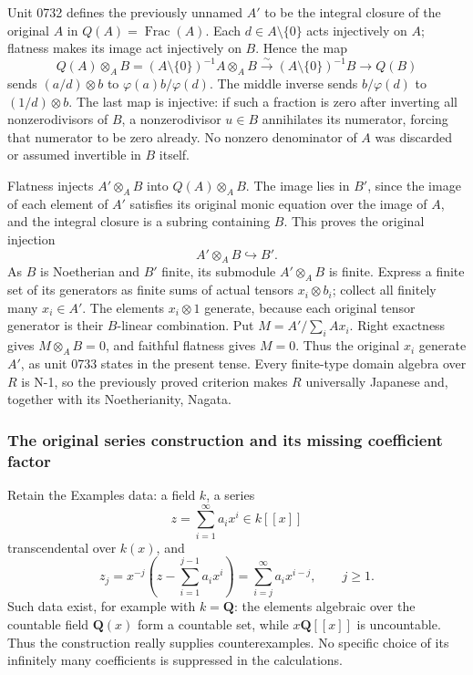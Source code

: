 Unit 0732 defines the previously unnamed \(A'\) to be the integral closure of the original \(A\) in \(Q(A)=\operatorname{Frac}(A)\). Each \(d\in A\setminus\{0\}\) acts injectively on \(A\); flatness makes its image act injectively on \(B\). Hence the map \[
 Q(A)\otimes_AB
 =(A\setminus\{0\})^{-1}A\otimes_AB
 \xrightarrow{\sim}(A\setminus\{0\})^{-1}B
 \longrightarrow Q(B)
\] sends \((a/d)\otimes b\) to \(\varphi(a)b/\varphi(d)\). The middle inverse sends \(b/\varphi(d)\) to \((1/d)\otimes b\). The last map is injective: if such a fraction is zero after inverting all nonzerodivisors of \(B\), a nonzerodivisor \(u\in B\) annihilates its numerator, forcing that numerator to be zero already. No nonzero denominator of \(A\) was discarded or assumed invertible in \(B\) itself.

Flatness injects \(A'\otimes_AB\) into \(Q(A)\otimes_AB\). The image lies in \(B'\), since the image of each element of \(A'\) satisfies its original monic equation over the image of \(A\), and the integral closure is a subring containing \(B\). This proves the original injection \[
 A'\otimes_AB\hookrightarrow B'.
\] As \(B\) is Noetherian and \(B'\) finite, its submodule \(A'\otimes_AB\) is finite. Express a finite set of its generators as finite sums of actual tensors \(x_i\otimes b_i\); collect all finitely many \(x_i\in A'\). The elements \(x_i\otimes1\) generate, because each original tensor generator is their \(B\)-linear combination. Put \(M=A'/\sum_iAx_i\). Right exactness gives \(M\otimes_AB=0\), and faithful flatness gives \(M=0\). Thus the original \(x_i\) generate \(A'\), as unit 0733 states in the present tense. Every finite-type domain algebra over \(R\) is N-1, so the previously proved criterion makes \(R\) universally Japanese and, together with its Noetherianity, Nagata.

\subsubsection{The original series construction and its missing coefficient factor}\label{algebra-proof-069-the-original-series-construction-and-its-missing-coefficient-factor}

Retain the Examples data: a field \(k\), a series \[
 z=\sum_{i=1}^{\infty}a_ix^i\in k[[x]]
\] transcendental over \(k(x)\), and \[
 z_j=x^{-j}\left(z-\sum_{i=1}^{j-1}a_ix^i\right)
     =\sum_{i=j}^{\infty}a_ix^{i-j},\qquad j\ge1.
\] Such data exist, for example with \(k=\mathbf Q\): the elements algebraic over the countable field \(\mathbf Q(x)\) form a countable set, while \(x\mathbf Q[[x]]\) is uncountable. Thus the construction really supplies counterexamples. No specific choice of its infinitely many coefficients is suppressed in the calculations.

